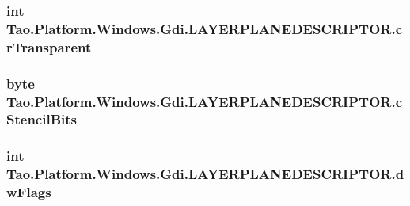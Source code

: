 \label{struct_tao_1_1_platform_1_1_windows_1_1_gdi_1_1_l_a_y_e_r_p_l_a_n_e_d_e_s_c_r_i_p_t_o_r_a9c392390554dcb0afeb4b9c35b90fd32}
\hypertarget{struct_tao_1_1_platform_1_1_windows_1_1_gdi_1_1_l_a_y_e_r_p_l_a_n_e_d_e_s_c_r_i_p_t_o_r_a63730c53f53c3ecc7256a6d3a2222c51}{
\subsubsection[{crTransparent}]{\setlength{\rightskip}{0pt plus 5cm}int {\bf Tao.Platform.Windows.Gdi.LAYERPLANEDESCRIPTOR.crTransparent}}}
\label{struct_tao_1_1_platform_1_1_windows_1_1_gdi_1_1_l_a_y_e_r_p_l_a_n_e_d_e_s_c_r_i_p_t_o_r_a63730c53f53c3ecc7256a6d3a2222c51}
\hypertarget{struct_tao_1_1_platform_1_1_windows_1_1_gdi_1_1_l_a_y_e_r_p_l_a_n_e_d_e_s_c_r_i_p_t_o_r_aef5bd02bb709e9f18e47d81a10bbd3a4}{
\subsubsection[{cStencilBits}]{\setlength{\rightskip}{0pt plus 5cm}byte {\bf Tao.Platform.Windows.Gdi.LAYERPLANEDESCRIPTOR.cStencilBits}}}
\label{struct_tao_1_1_platform_1_1_windows_1_1_gdi_1_1_l_a_y_e_r_p_l_a_n_e_d_e_s_c_r_i_p_t_o_r_aef5bd02bb709e9f18e47d81a10bbd3a4}
\hypertarget{struct_tao_1_1_platform_1_1_windows_1_1_gdi_1_1_l_a_y_e_r_p_l_a_n_e_d_e_s_c_r_i_p_t_o_r_a3e8209bfdb702986734c858fab393a8f}{
\subsubsection[{dwFlags}]{\setlength{\rightskip}{0pt plus 5cm}int {\bf Tao.Platform.Windows.Gdi.LAYERPLANEDESCRIPTOR.dwFlags}}}
\label{struct_tao_1_1_platform_1_1_windows_1_1_gdi_1_1_l_a_y_e_r_p_l_a_n_e_d_e_s_c_r_i_p_t_o_r_a3e8209bfdb702986734c858fab393a8f}
